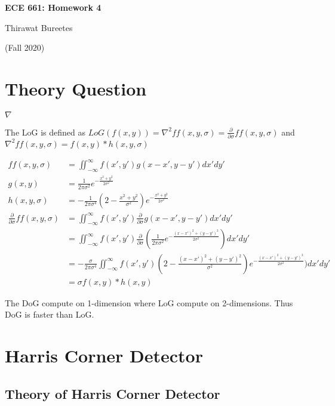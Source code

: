 \documentclass[11pt]{article}
\begin{document}
\begin{center}
\Large{\textbf{ECE 661: Homework 4}}

Thirawat Bureetes

(Fall 2020)
\end{center}
	
 

\section*{Theory Question}

$\nabla$

The LoG is defined as $
LoG(f(x,y)) = \nabla^2 ff(x,y,\sigma) 
= \frac{\partial}{\partial \sigma} ff(x,y,\sigma)
$ and $ \nabla^2 ff(x,y,\sigma)  = f(x,y) * h(x,y,\sigma)$

\begin{align*}
ff(x,y,\sigma) &= \iint^{\infty}_{-\infty} f(x', y')g(x-x',y-y')dx'dy' \\
g(x,y) &=  \frac{1}{2 \pi \sigma^2} e^{-\frac{x^2+y^2}{2\sigma^2}}\\
h(x,y,\sigma) &= -\frac{1}{2 \pi \sigma^4}(2- \frac{x^2+y^2}{\sigma^2})e^{-\frac{x^2+y^2}{2\sigma^2}}\\
\frac{\partial}{\partial \sigma} ff(x,y,\sigma)  &=  \iint^{\infty}_{-\infty} f(x', y') \frac{\partial}{\partial \sigma}g(x-x',y-y')dx'dy' \\
&=  \iint^{\infty}_{-\infty} f(x', y') \frac{\partial}{\partial \sigma}  (\frac{1}{2 \pi \sigma^2} e^{-\frac{(x-x')^2+(y-y')^2}{2\sigma^2}})  dx'dy' \\
&=  -\frac{\sigma}{2 \pi \sigma^4} \iint^{\infty}_{-\infty} f(x', y') (2- \frac{(x-x')^2+(y-y')^2}{\sigma^2}) e^{-\frac{(x-x')^2+(y-y')^2}{2\sigma^2}})  dx'dy' \\
&= \sigma f(x,y) * h(x,y)
\end{align*}

The DoG compute on 1-dimension where LoG compute on 2-dimensions. Thus DoG is faster than LoG.


\section*{Harris Corner Detector}

\subsection*{Theory of Harris Corner Detector}
\end{document}
